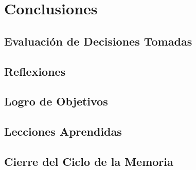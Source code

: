 \chapter{Conclusiones}

\section{Evaluación de Decisiones Tomadas}
	
\section{Reflexiones}

\section{Logro de Objetivos}

\section{Lecciones Aprendidas}

\section{Cierre del Ciclo de la Memoria}

